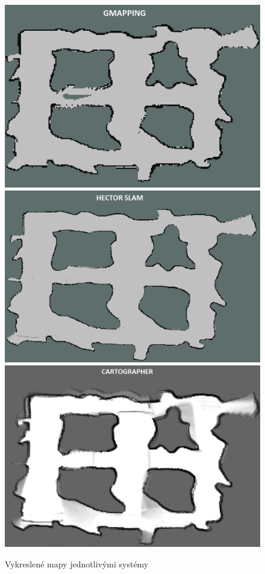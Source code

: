 \documentclass[12pt]{report}
\begin{document}
\begin{figure}[!ht]
	\begin{center}
		\includegraphics[width=0.5\columnwidth]{imgs/Maps/Bag/newmaze_with_ground_truth/gmapping_newmaze_with_ground_truth.png}
		\includegraphics[width=0.5\columnwidth]{imgs/Maps/Bag/newmaze_with_ground_truth/hector_newmaze_with_ground_truth.png}
		\includegraphics[width=0.5\columnwidth]{imgs/Maps/Bag/newmaze_with_ground_truth/cartographer_newmaze_with_ground_truth.png}
	\end{center}
	\caption{Vykreslené mapy jednotlivými systémy}
	\label{fig:mapy_stage}
\end{figure}

\newpage 
\end{document}
